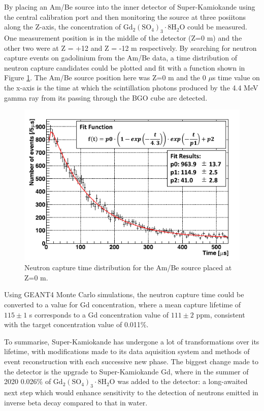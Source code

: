 By placing an Am/Be source into the inner detector of Super-Kamiokande using the central calibration port and then monitoring the source at three posiitons along the Z-axis, the concentration of $\mathrm{Gd}_{2}\left(\mathrm{SO}_{4}\right)_{3} \cdot 8 \mathrm{H}_{2} \mathrm{O}$ could be measured. One measurement position is in the middle of the detector (Z=0 m) and the other two were at Z = +12 and Z = -12 m respectively. By searching for neutron capture events on gadolinium from the Am/Be data, a time distribution of neutron capture candidates could be plotted and fit with a function shown in Figure \ref{fig:ambe_time}. The Am/Be source position here was Z=0 m and the 0 $\mu$s time value on the x-axis is the time at which the scintillation photons produced by the 4.4 MeV gamma ray from its passing through the BGO cube are detected. 


\begin{figure}[H]
    \includegraphics[width=\textwidth]{Figures/ambe_time.png}
    \caption{Neutron capture time distribution for the Am/Be source placed at Z=0 m.}
    \label{fig:ambe_time}
\end{figure}

Using GEANT4 Monte Carlo simulations, the neutron capture time could be converted to a value for Gd concentration, where a mean capture lifetime of $115 \pm 1$ \micro s corresponds to a Gd concentration value of $111 \pm 2$ ppm, consistent with the target concentration value of 0.011\%.


To summarise, Super-Kamiokande has undergone a lot of transformations over its lifetime, with modifications made to its data aquisition system and methods of event reconstruction with each successive new phase. The biggest change made to the detector is the upgrade to Super-Kamiokande Gd, where in the summer of 2020 0.026\% of $\mathrm{Gd}_{2}\left(\mathrm{SO}_{4}\right)_{3} \cdot 8 \mathrm{H}_{2} \mathrm{O}$ was added to the detector: a long-awaited next step which would enhance sensitivity to the detection of neutrons emitted in inverse beta decay compared to that in water.

















